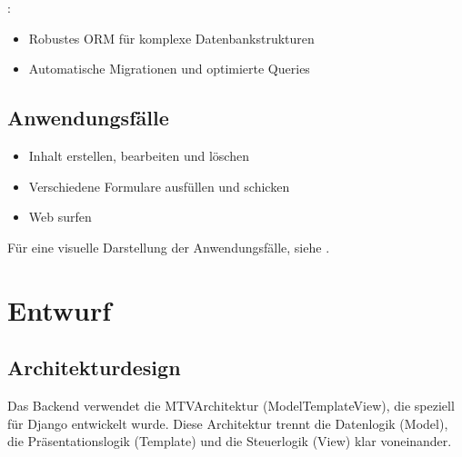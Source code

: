 \documentclass[a4paper,12pt,ngerman]{sphinxmanual}
\begin{document}
\sphinxAtStartPar
{}:
\begin{itemize}
\item {} 
\sphinxAtStartPar
Robustes ORM für komplexe Datenbankstrukturen

\item {} 
\sphinxAtStartPar
Automatische Migrationen und optimierte Queries

\end{itemize}


\subsection{Anwendungsfälle}
\label{\detokenize{sections/projektplanung_analyse:anwendungsfalle}}
\sphinxAtStartPar
{}
\begin{itemize}
\item {} 
\sphinxAtStartPar
Inhalt erstellen, bearbeiten und löschen

\end{itemize}

\sphinxAtStartPar
{}
\begin{itemize}
\item {} 
\sphinxAtStartPar
Verschiedene Formulare ausfüllen und schicken

\item {} 
\sphinxAtStartPar
Web surfen

\end{itemize}

\sphinxAtStartPar
Für eine visuelle Darstellung der Anwendungsfälle, siehe {\hyperref[\detokenize{sections/diagramme:use-case-diagram}]{}}.

\sphinxstepscope


\section{Entwurf}
\label{\detokenize{sections/entwurf:entwurf}}\label{\detokenize{sections/entwurf::doc}}

\subsection{Architekturdesign}
\label{\detokenize{sections/entwurf:architekturdesign}}
\sphinxAtStartPar
Das Backend verwendet die MTV\sphinxhyphen{}Architektur (Model\sphinxhyphen{}Template\sphinxhyphen{}View), die speziell für Django entwickelt wurde. Diese Architektur trennt die Datenlogik (Model), die Präsentationslogik (Template) und die Steuerlogik (View) klar voneinander.
\end{document}
